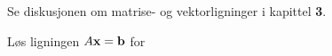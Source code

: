 \begin{losning}
Se diskusjonen om matrise- og vektorligninger i kapittel \textbf{3}.
\end{losning}



\begin{oppgave}
Løs ligningen $A\mathbf{x}=\mathbf{b}$ for 

\end{oppgave}
